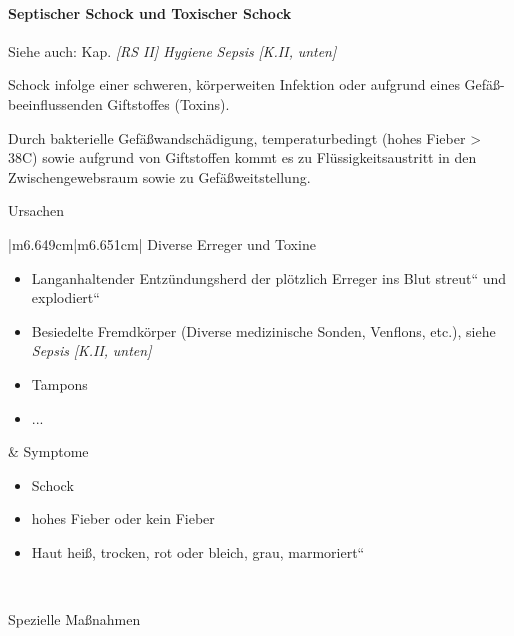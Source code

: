 \documentclass{article}
\begin{document}
\paragraph[Septischer Schock und Toxischer Schock]{Septischer Schock und
Toxischer Schock}
\label{bkm:RefHeading41284910}{\mdseries
Siehe auch: Kap. \textit{[RS II] Hygiene }\textit{ {\guillemotright}
}\textit{Sepsis}\textit{
[}\textit{K.II}\textit{{\guillemotright}}\textit{\pageref{bkm:RefHeading41252510}}\textit{,
}\textit{unten}\textit{]}}

{\mdseries
Schock infolge einer schweren, k\"orperweiten Infektion oder aufgrund
eines Gef\"a{\ss}-beeinflussenden Giftstoffes (Toxins).}

{\mdseries
Durch bakterielle Gef\"a{\ss}wandsch\"adigung, temperaturbedingt (hohes
Fieber {\textgreater} 38{\textdegree}C) sowie aufgrund von Giftstoffen
kommt es zu Fl\"ussigkeitsaustritt in den Zwischen\-gewebs\-raum sowie
zu Gef\"a{\ss}weitstellung.}

{\mdseries\color{black}
Ursachen}

\begin{center}
\tablehead{}\begin{supertabular}{|m{6.649cm}|m{6.651cm}|}
\hline
{\mdseries Diverse Erreger und Toxine}

\begin{itemize}
\item {\mdseries Langanhaltender Entz\"undungsherd der pl\"otzlich
Erreger {\quotedblbase}ins Blut streut{\textquotedblleft} und
{\quotedblbase}explodiert{\textquotedblleft}}

\item {\mdseries Besiedelte Fremdk\"orper (Diverse medizinische Sonden,
Venflons, etc.), siehe \textit{Sepsis}\textit{
[}\textit{K.II}\textit{{\guillemotright}}\textit{\pageref{bkm:RefHeading41252510}}\textit{,
}\textit{unten}\textit{]}}

\item {\mdseries Tampons}

\item {\mdseries ...}

\end{itemize}
 &
{\mdseries\color{black} Symptome}

\begin{itemize}
\item {\mdseries Schock}

\item {\mdseries hohes Fieber oder kein Fieber}

\item {\mdseries Haut hei{\ss}, trocken, rot oder bleich, grau,
{\quotedblbase}marmoriert{\textquotedblleft}}

\end{itemize}
\\\hline
\end{supertabular}
\end{center}
{\mdseries\color{black}
Spezielle Ma{\ss}nahmen}
\end{document}
